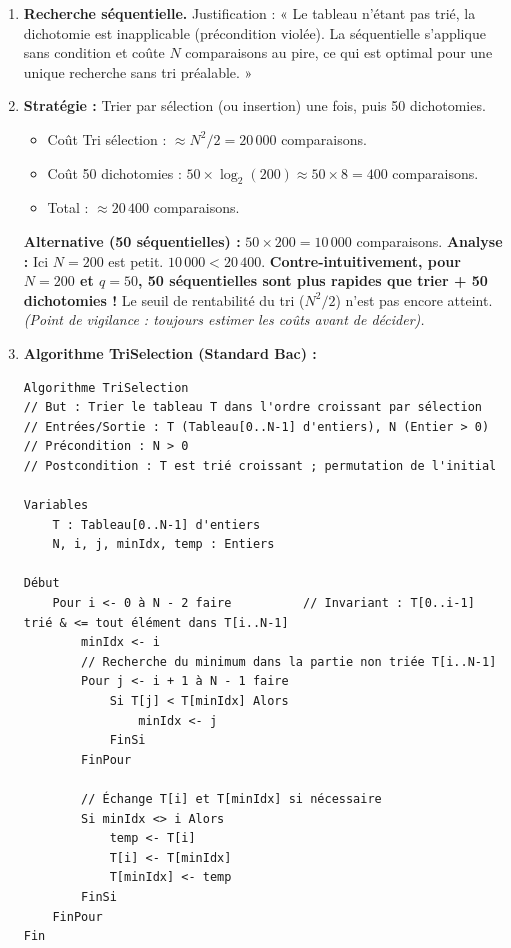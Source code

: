 \documentclass[11pt]{article}
\begin{document}
\begin{corrige}[Exercice n]
\begin{enumerate}
    \item \textbf{Recherche séquentielle.} Justification : « Le tableau n'étant pas trié, la dichotomie est inapplicable (précondition violée). La séquentielle s'applique sans condition et coûte $N$ comparaisons au pire, ce qui est optimal pour une unique recherche sans tri préalable. »
    \item \textbf{Stratégie :} Trier par sélection (ou insertion) une fois, puis 50 dichotomies.
    \begin{itemize}
        \item Coût Tri sélection : $\approx N^2/2 = 20\,000$ comparaisons.
        \item Coût 50 dichotomies : $50 \times \log_2(200) \approx 50 \times 8 = 400$ comparaisons.
        \item Total : $\approx 20\,400$ comparaisons.
    \end{itemize}
    \textbf{Alternative (50 séquentielles) :} $50 \times 200 = 10\,000$ comparaisons.
    \textbf{Analyse :} Ici $N=200$ est petit. $10\,000 < 20\,400$. \textbf{Contre-intuitivement, pour $N=200$ et $q=50$, 50 séquentielles sont plus rapides que trier + 50 dichotomies !} Le seuil de rentabilité du tri ($N^2/2$) n'est pas encore atteint. \emph{(Point de vigilance : toujours estimer les coûts avant de décider).}
    \item \textbf{Algorithme TriSelection (Standard Bac) :}
\begin{lstlisting}
Algorithme TriSelection
// But : Trier le tableau T dans l'ordre croissant par sélection
// Entrées/Sortie : T (Tableau[0..N-1] d'entiers), N (Entier > 0)
// Précondition : N > 0
// Postcondition : T est trié croissant ; permutation de l'initial

Variables
    T : Tableau[0..N-1] d'entiers
    N, i, j, minIdx, temp : Entiers

Début
    Pour i <- 0 à N - 2 faire          // Invariant : T[0..i-1] trié & <= tout élément dans T[i..N-1]
        minIdx <- i
        // Recherche du minimum dans la partie non triée T[i..N-1]
        Pour j <- i + 1 à N - 1 faire
            Si T[j] < T[minIdx] Alors
                minIdx <- j
            FinSi
        FinPour
        
        // Échange T[i] et T[minIdx] si nécessaire
        Si minIdx <> i Alors
            temp <- T[i]
            T[i] <- T[minIdx]
            T[minIdx] <- temp
        FinSi
    FinPour
Fin
\end{lstlisting}
\end{enumerate}
\end{corrige}
\end{document}

